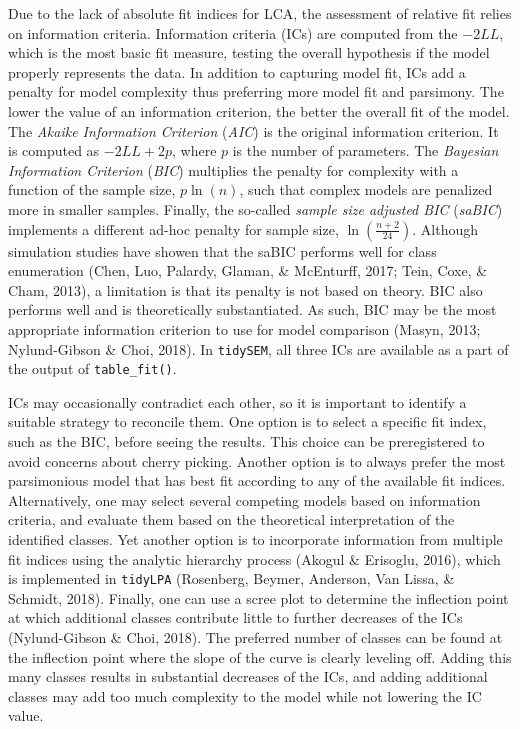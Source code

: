 \documentclass[
  ,man,floatsintext]{apa6}
\begin{document}
Due to the lack of absolute fit indices for LCA, the assessment of relative fit
relies on information criteria.
Information criteria (ICs) are computed from the \(-2LL\),
which is the most basic fit measure, testing the overall hypothesis if the model properly represents the data.
In addition to capturing model fit, ICs add a penalty for model complexity thus
preferring more model fit and parsimony.
The lower the value of an information criterion, the better the overall fit of the
model.
The \emph{Akaike Information Criterion} (\emph{AIC}) is the original information criterion.
It is computed as \(-2LL+2p\), where \(p\) is the number of parameters.
The \emph{Bayesian Information Criterion} (\emph{BIC}) multiplies the penalty for complexity with a function of the sample size, \(p \ln(n)\),
such that complex models are penalized more in smaller samples.
Finally,
the so-called \emph{sample size adjusted BIC} (\emph{saBIC}) implements a different ad-hoc penalty for sample size,
\(\ln(\frac{n + 2}{24})\). Although simulation studies have showen that the saBIC performs well for class enumeration (Chen, Luo, Palardy, Glaman, \& McEnturff, 2017; Tein, Coxe, \& Cham, 2013),
a limitation is that its penalty is not based on theory. BIC also performs well and is theoretically substantiated.
As such, BIC may be the most appropriate information criterion to use for model comparison (Masyn, 2013; Nylund-Gibson \& Choi, 2018).
In \texttt{tidySEM}, all three ICs are available as a part of the output of \texttt{table\_fit()}.

ICs may occasionally contradict each other, so it is
important to identify a suitable strategy to reconcile them.
One option is to select a specific fit index, such as the BIC,
before seeing the results.
This choice can be preregistered to avoid concerns about cherry picking.
Another option is to always prefer the most parsimonious model that has best fit according to any of the available fit indices.
Alternatively, one may select several competing models based on information criteria,
and evaluate them based on the theoretical interpretation of the identified classes.
Yet another option is to incorporate information from multiple fit indices using the analytic hierarchy process (Akogul \& Erisoglu, 2016),
which is implemented in \texttt{tidyLPA} (Rosenberg, Beymer, Anderson, Van Lissa, \& Schmidt, 2018).
Finally, one can use a scree plot to determine the inflection point at which additional classes contribute little to further decreases of the ICs (Nylund-Gibson \& Choi, 2018).
The preferred number of classes can be found at the inflection point where the slope of the curve is clearly leveling off.
Adding this many classes results in substantial decreases of the ICs,
and adding additional classes may add too much complexity to the model while not lowering the IC value.
\end{document}
